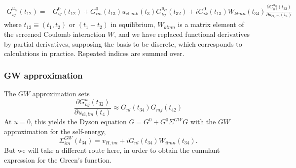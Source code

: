\begin{align}
G_{i j}^{u_{cl}}\left(t_{12}\right)= & G_{i j}^{0}\left(t_{12}\right)+G_{i m}^{0}\left(t_{13}\right) u_{\mathrm{cl}, m k}\left(t_{3}\right) G_{k j}^{u_{cl}}\left(t_{32}\right) +i G_{i k}^{0}\left(t_{13}\right) W_{k l m n}\left(t_{34}\right) \frac{\partial G_{n j}^{u_{cl}}\left(t_{32}\right)}{\partial u_{\mathrm{cl}, l m}\left(t_{4}\right)}
\label{eq:gw_start}
\end{align}
where $t_{12} \equiv\left(t_{1}, t_{2}\right)$ or $\left(t_{1}-t_{2}\right)$ in equilibrium, $W_{k l m n}$ is a matrix element of the screened Coulomb interaction $W$, and we have replaced functional derivatives by partial derivatives, supposing the basis to be discrete, which corresponds to calculations in practice. Repeated indices are summed over.
\subsubsection{GW approximation}
 The $GW$ approximation sets
\begin{equation}
\frac{\partial G_{n j}^{u}\left(t_{32}\right)}{\partial u_{\mathrm{cl}, l m}\left(t_{4}\right)} \approx G_{n l}\left(t_{34}\right) G_{m j}\left(t_{42}\right)
\end{equation}
At $u=0$, this yields the Dyson equation $G =G^{0}+G^{0} \Sigma^{G W} G$ with the $GW$ approximation for the self-energy,
\begin{equation}
\Sigma_{i m}^{G W}\left(t_{34}\right)=v_{H, i m}+i G_{n l}\left(t_{34}\right) W_{i l m n}\left(t_{34}\right) .
\end{equation}
But we will take a different route here, in order to obtain the cumulant expression for the Green's function.
